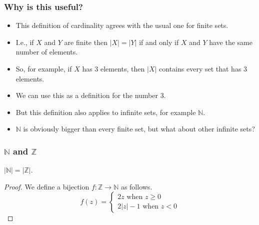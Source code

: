 \documentclass[handout]{beamer}
\newcommand{\bN}{\mathbb{N}}
\newcommand{\bZ}{\mathbb{Z}}
\begin{document}
\begin{frame}
\frametitle{Why is this useful?}
\begin{itemize}
\item This definition of cardinality agrees with the usual one for finite sets.
\vspace{0.3cm}
\item I.e., if $X$ and $Y$ are finite then $|X|=|Y|$ if and only if $X$ and $Y$ have the same number of elements.
\vspace{0.3cm}
\item So, for example, if $X$ has 3 elements, then $|X|$ contains every set that has 3 elements. 
\vspace{0.3cm}
\item We can use this as a definition for the number 3.
\vspace{0.3cm}
\item But this definition also applies to infinite sets, for example $\bN$.
\vspace{0.3cm}
\item $\bN$ is obviously bigger than every finite set, but what about other infinite sets?
\end{itemize}
\end{frame}

\begin{frame}
\frametitle{$\bN$ and $\bZ$}
\begin{theorem}
$|\bN|=|\bZ|$.
\end{theorem}
\begin{proof}
We define a bijection $f:\bZ\to\bN$ as follows.
\[f(z)=\begin{cases}2z \text{ when $z\geq 0$} \\
2|z| - 1 \text{ when $z<0$} \end{cases}\]
\end{proof}
\end{frame}
\end{document}
